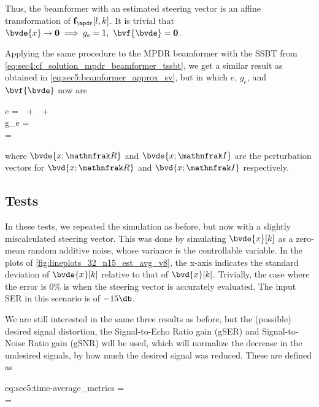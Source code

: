 Thus, the beamformer with an estimated steering vector is an affine transformation of $\bvfb{\mpdr}[l,k]$. It is trivial that $\bvde{x} \to \mathbf{0} \implies g_e = 1,~\bvf{\bvde} = \mathbf{0}$.

Applying the same procedure to the MPDR beamformer with the SSBT from \cref{eq:sec4:cf_solution_mpdr_beamformer_tssbt}, we get a similar result as obtained in \cref{eq:sec5:beamformer_approx_sv}, but in which $e$, $g_e$, and $\bvf{\bvde}$ now are
\begin{subgather}
	e =  \,\bvOm\,  +  \,\bvOm\,  +  \,\bvOm\,  \\
	g_e =  \\
	\bvf{\bvde} = 
\end{subgather}
where $\bvde{x;\re}$ and $\bvde{x;\im}$ are the perturbation vectors for $\bvd{x;\re}$ and $\bvd{x;\im}$ respectively.

\subsection{Tests}

In these tests, we repeated the simulation as before, but now with a slightly miscalculated steering vector. This was done by simulating $\bvde{x}[k]$ as a zero-mean random additive noise, whose variance is the controllable variable. In the plots of \cref{fig:lineplots_32_n15_est_avg_v8}, the x-axis indicates the standard deviation of $\bvde{x}[k]$ relative to that of $\bvd{x}[k]$. Trivially, the case where the error is $0\%$ is when the steering vector is accurately evaluated. The input SER in this scenario is of $-15\dB$.

We are still interested in the same three results as before, but the (possible) desired signal distortion, the Signal-to-Echo Ratio gain (gSER) and Signal-to-Noise Ratio gain (gSNR) will be used, which will normalize the decrease in the undesired signals, by how much the desired signal was reduced. These are defined as
\begin{subgather}{eq:sec5:time-average_metrics}
	\gser = \frac{\erle}{\dsrf} \\
	\gsnr = \frac{\nsrf}{\dsrf}
\end{subgather}

